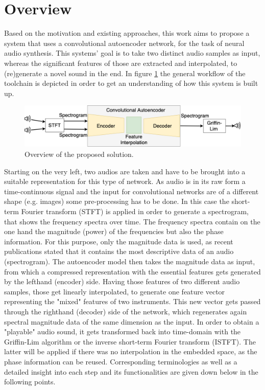 \section{Overview}
\label{sec:app_overview}
Based on the motivation and existing approaches, this work aims to propose a system that uses a convolutional autoencoder network, for the task of neural audio synthesis. This systems' goal is to take two distinct audio samples as input, whereas the significant features of those are extracted and interpolated, to (re)generate a novel sound in the end. In figure \ref{fig:toolchain} the general workflow of the toolchain is depicted in order to get an understanding of how this system is built up. 

 \begin{figure}[htb!]
	\caption{Overview of the proposed solution.}
	\label{fig:toolchain}
	\centering
	\includegraphics[width=\textwidth]{images/approach/Toolchain.png}
\end{figure}

Starting on the very left, two audios are taken and have to be brought into a suitable representation for this type of network. As audio is in its raw form a time-continuous signal and the input for convolutional networks are of a different shape (e.g. images) some pre-processing has to be done. In this case the short-term Fourier transform (STFT) is applied in order to generate a spectrogram, that shows the frequency spectra over time. The frequency spectra contain on the one hand the magnitude (power) of the frequencies but also the phase information. For this purpose, only the magnitude data is used, as recent publications stated that it contains the most descriptive data of an audio (spectrogram). The autoencoder model then takes the magnitude data as input, from which a compressed representation with the essential features gets generated by the lefthand (encoder) side. Having those features of two different audio samples, those get linearly interpolated, to generate one feature vector representing the "mixed" features of two instruments. This new vector gets passed through the righthand (decoder) side of the network, which regenerates again spectral magnitude data of the same dimension as the input. In order to obtain a "playable" audio sound, it gets transformed back into time-domain with the Griffin-Lim algorithm \cite{Griffin1984} or the inverse short-term Fourier transform (ISTFT). The latter will be applied if there was no interpolation in the embedded space, as the phase information can be reused. Corresponding terminologies as well as a detailed insight into each step and its functionalities are given down below in the following points.

